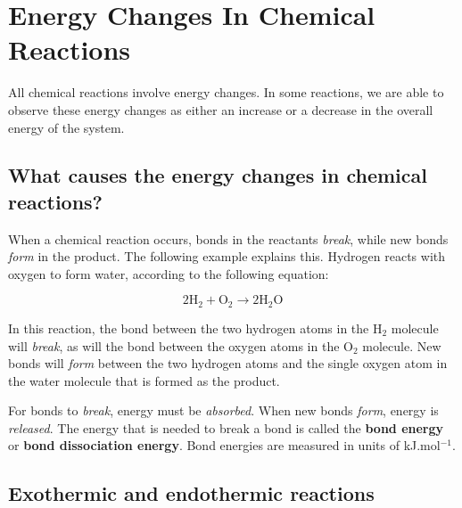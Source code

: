 \chapter{Energy Changes In Chemical Reactions}
\label{chap:energychanges}

All chemical reactions involve energy changes. In some reactions, we are able to observe these energy changes as either an increase or a decrease in the overall energy of the system.


\section{What causes the energy changes in chemical reactions?}

When a chemical reaction occurs, bonds in the reactants \textit{break}, while new bonds \textit{form} in the product. The following example explains this.
Hydrogen reacts with oxygen to form water, according to the following equation:

\begin{equation*}
2\text{H}_{2} + \text{O}_{2} \rightarrow 2\text{H}_{2}\text{O}
\end{equation*}

In this reaction, the bond between the two hydrogen atoms in the H$_{2}$ molecule will \textit{break}, as will the bond between the oxygen atoms in the O$_{2}$ molecule. New bonds will \textit{form} between the two hydrogen atoms and the single oxygen atom in the water molecule that is formed as the product.

For bonds to \textit{break}, energy must be \textit{absorbed}. When new bonds \textit{form}, energy is \textit{released}. The energy that is needed to break a bond is called the \textbf{bond energy} or \textbf{bond dissociation energy}. Bond energies are measured in units of kJ.mol$^{-1}$.








\section{Exothermic and endothermic reactions}
\label{sec:energychanges:exoendo}

